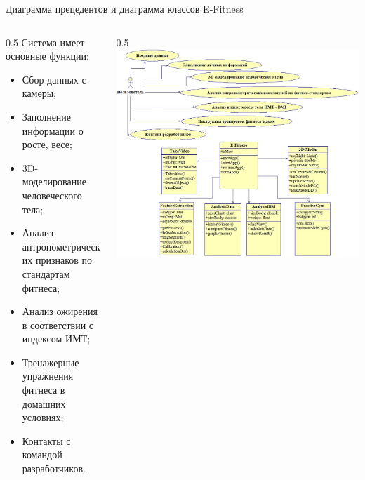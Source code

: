 \documentclass[10pt,pdf,hyperref={unicode},xcolor=table]{beamer}
\begin{document}
\begin{frame}{Диаграмма прецедентов и диаграмма классов E-Fitness}
\begin{columns}
		\begin{column} {0.5\textwidth}			
Система имеет основные функции:
\begin{itemize}
	\item Сбор данных с камеры;
	\item Заполнение информации о росте, весе;
	\item 3D-моделирование человеческого тела;
	\item Анализ антропометрических признаков по стандартам фитнеса;
	\item Анализ ожирения в соответствии с индексом ИМТ;
	\item Тренажерные упражнения фитнеса в домашних условиях;
	\item Контакты с командой разработчиков.
\end{itemize}
			\end{column}
			\begin{column} {0.5\textwidth}
\includegraphics[width=1\linewidth]{p17}
			\end{column}      
		\end{columns}
\end{frame}
\end{document}
